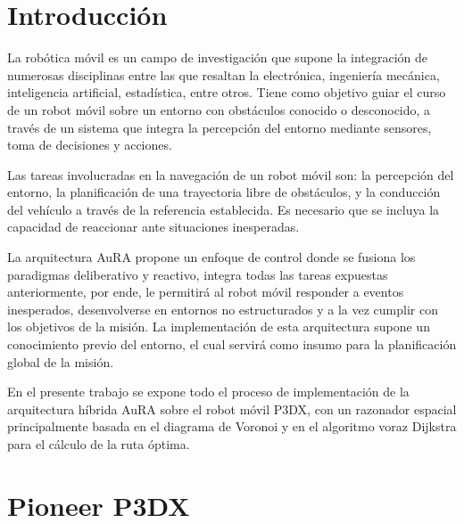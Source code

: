 \documentclass[11pt,twoside,A5]{article}
\begin{document}
%
%
%

\section*{Introducción}

La robótica móvil es un campo de investigación que supone la integración de numerosas disciplinas
entre las que resaltan la electrónica, ingeniería mecánica,
inteligencia artificial, estadística, entre otros. Tiene como objetivo 
guiar el curso de un robot móvil sobre un entorno con obstáculos conocido o desconocido,
a través de un sistema que integra la percepción del entorno mediante
sensores, toma de decisiones y acciones.

Las tareas involucradas en la navegación de un robot móvil son: la percepción del
entorno, la planificación de una trayectoria libre de obstáculos, y la conducción del vehículo a través de la referencia establecida.
Es necesario que se incluya la capacidad de reaccionar ante situaciones inesperadas.

La arquitectura AuRA propone un enfoque de control donde se fusiona los paradigmas deliberativo y reactivo,
integra todas las tareas expuestas anteriormente, por ende, le permitirá al robot móvil responder a eventos inesperados, desenvolverse en 
entornos no estructurados y a la vez cumplir con los objetivos de la misión. La implementación de esta arquitectura supone un conocimiento previo
del entorno, el cual servirá como insumo para la planificación global de la misión.

En el presente trabajo se expone todo el proceso de implementación de la arquitectura híbrida AuRA sobre el robot móvil P3DX,
con un razonador espacial principalmente basada en el diagrama de Voronoi y en el algoritmo voraz Dijkstra para el cálculo de 
la ruta óptima.

\section*{Pioneer P3DX}
\end{document}
